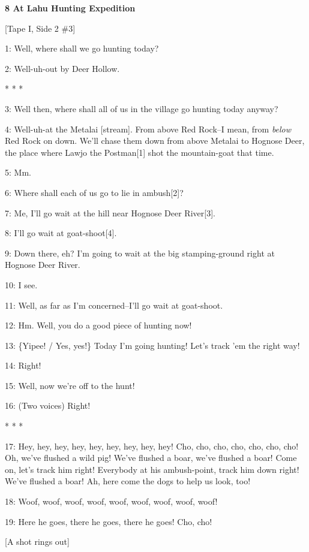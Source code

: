 
\textbf{8 At Lahu Hunting Expedition}

[Tape I, Side 2 \#3]

1: Well, where shall we go hunting today?

2: Well-uh-out by Deer Hollow.

\begin{center}
* * *
\end{center}

\leftskip=0pt
3: Well then, where shall all of us in the village go hunting today anyway?

4: Well-uh-at the Metalai [stream]. From above Red Rock--I mean, from \textit{below}
Red Rock on down. We'll chase them down from above Metalai to Hognose Deer, the
place where Lawjo the Postman[1] shot the mountain-goat that time.

5: Mm.

6: Where shall each of us go to lie in ambush[2]?

7: Me, I'll go wait at the hill near Hognose Deer River[3].

8: I'll go wait at goat-shoot[4].

9: Down there, eh? I'm going to wait at the big stamping-ground right at Hognose
Deer River.

10: I see.

11: Well, as far as I'm concerned--I'll go wait at goat-shoot.

12: Hm. Well, you do a good piece of hunting now!

13: \{Yipee! / Yes, yes!\} Today I'm going hunting! Let's track 'em the right way!

14: Right!

15: Well, now we're off to the hunt!

16: (Two voices) Right!

\begin{center}
* * *
\end{center}

\leftskip=0pt
17: Hey, hey, hey, hey, hey, hey, hey, hey, hey!  Cho, cho, cho, cho, cho, cho,
cho! Oh, we've flushed a wild pig! We've flushed a boar, we've flushed a boar!
Come on, let's track him right! Everybody at his ambush-point, track him down right!
We've flushed a boar! Ah, here come the dogs to help us look, too!

18: Woof, woof, woof, woof, woof, woof, woof, woof, woof!

19: Here he goes, there he goes, there he goes! Cho, cho!

[A shot rings out]


